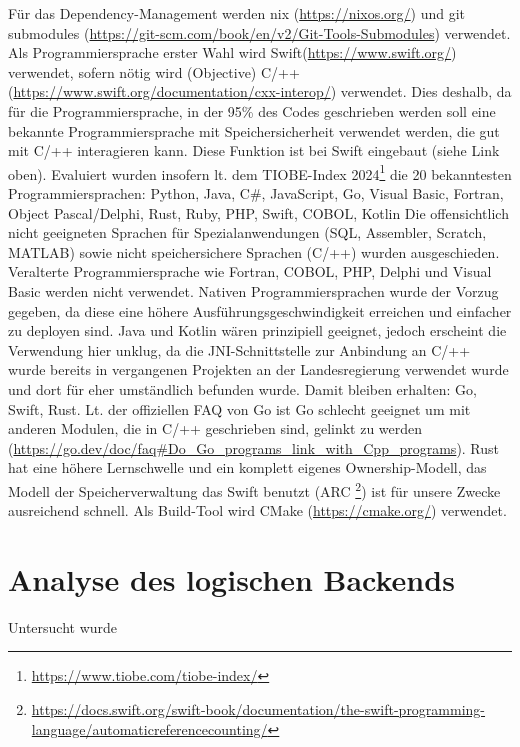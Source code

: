 \documentclass[8pt]{article}
\begin{document}
\begin{outline}
    \1 Für das Dependency-Management werden nix (\url{https://nixos.org/}) und
        git submodules (\url{https://git-scm.com/book/en/v2/Git-Tools-Submodules}) verwendet.
    \1 Als Programmiersprache erster Wahl wird Swift\textregistered (\url{https://www.swift.org/}) verwendet,
        sofern nötig wird (Objective) C/++ (\url{https://www.swift.org/documentation/cxx-interop/}) verwendet.
        \2 Dies deshalb, da für die Programmiersprache, in der 95\% des Codes geschrieben werden soll
            eine bekannte Programmiersprache mit Speichersicherheit verwendet werden, die gut mit C/++ interagieren kann.
            Diese Funktion ist bei Swift eingebaut (siehe Link oben).
        \2 Evaluiert wurden insofern lt. dem TIOBE-Index 2024\footnote{\url{https://www.tiobe.com/tiobe-index/}} die 20 bekanntesten Programmiersprachen:
            Python, Java, C\#, JavaScript, Go, Visual Basic, Fortran, Object Pascal/Delphi, Rust, Ruby, PHP, Swift, COBOL, Kotlin
        \2 Die offensichtlich nicht geeigneten Sprachen für Spezialanwendungen (SQL, Assembler, Scratch, MATLAB) sowie
            nicht speichersichere Sprachen (C/++) wurden ausgeschieden.
        \2 Veralterte Programmiersprache wie Fortran, COBOL, PHP, Delphi und Visual Basic werden nicht verwendet.
        \2 Nativen Programmiersprachen wurde der Vorzug gegeben, da diese eine höhere Ausführungsgeschwindigkeit erreichen
            und einfacher zu deployen sind. Java und Kotlin wären prinzipiell geeignet, jedoch erscheint die Verwendung hier unklug,
            da  die JNI-Schnittstelle zur Anbindung an C/++ wurde bereits in vergangenen Projekten an der Landesregierung verwendet
            wurde und dort für eher umständlich befunden wurde.
        \2 Damit bleiben erhalten: Go, Swift, Rust.
        \2 Lt. der offiziellen FAQ von Go ist Go schlecht geeignet um mit anderen Modulen, die in C/++ geschrieben sind,
            gelinkt zu werden (\url{https://go.dev/doc/faq#Do_Go_programs_link_with_Cpp_programs}).
        \2 Rust hat eine höhere Lernschwelle und ein komplett eigenes Ownership-Modell, das Modell der Speicherverwaltung das Swift benutzt
            (ARC \footnote{\url{https://docs.swift.org/swift-book/documentation/the-swift-programming-language/automaticreferencecounting/}}) ist
            für unsere Zwecke ausreichend schnell.
    \1 Als Build-Tool wird CMake (\url{https://cmake.org/}) verwendet.
\end{outline}

\section{Analyse des logischen Backends}
Untersucht wurde
\begin{itemize}
\end{itemize}
\endsection
\end{document}
